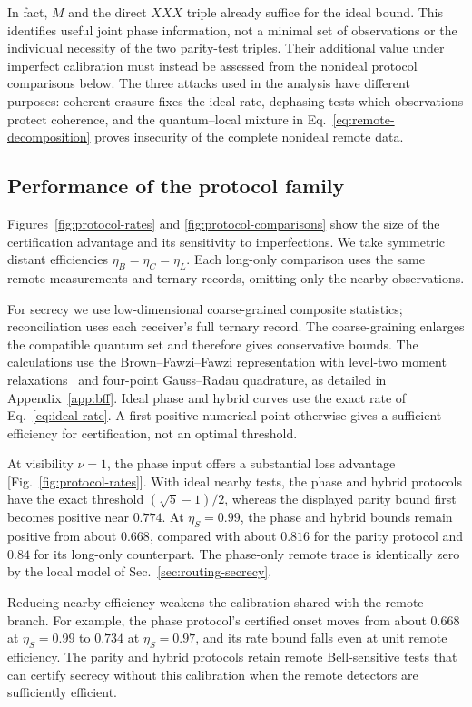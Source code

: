 \documentclass[aps,10pt,onecolumn,prx,superscriptaddress,longbibliography,nofootinbib]{revtex4-2}
\begin{document}
In fact, \(M\) and the direct \(XXX\) triple already suffice for the ideal bound. This identifies useful joint phase information, not a minimal set of observations or the individual necessity of the two parity-test triples. Their additional value under imperfect calibration must instead be assessed from the nonideal protocol comparisons below. The three attacks used in the analysis have different purposes: coherent erasure fixes the ideal rate, dephasing tests which observations protect coherence, and the quantum--local mixture in Eq.~\eqref{eq:remote-decomposition} proves insecurity of the complete nonideal remote data.

\subsection{Performance of the protocol family}

Figures~\ref{fig:protocol-rates} and \ref{fig:protocol-comparisons} show the size of the certification advantage and its sensitivity to imperfections. We take symmetric distant efficiencies \(\eta_B=\eta_C=\eta_L\). Each long-only comparison uses the same remote measurements and ternary records, omitting only the nearby observations.

For secrecy we use low-dimensional coarse-grained composite statistics; reconciliation uses each receiver's full ternary record. The coarse-graining enlarges the compatible quantum set and therefore gives conservative bounds. The calculations use the Brown--Fawzi--Fawzi representation with level-two moment relaxations~\cite{Brown2021,Brown2024,NPA2007,NPA2008,Pironio2010} and four-point Gauss--Radau quadrature, as detailed in Appendix~\ref{app:bff}. Ideal phase and hybrid curves use the exact rate of Eq.~\eqref{eq:ideal-rate}. A first positive numerical point otherwise gives a sufficient efficiency for certification, not an optimal threshold.

At visibility \(\nu=1\), the phase input offers a substantial loss advantage [Fig.~\ref{fig:protocol-rates}]. With ideal nearby tests, the phase and hybrid protocols have the exact threshold \((\sqrt5-1)/2\), whereas the displayed parity bound first becomes positive near \(0.774\). At \(\eta_S=0.99\), the phase and hybrid bounds remain positive from about \(0.668\), compared with about \(0.816\) for the parity protocol and \(0.84\) for its long-only counterpart. The phase-only remote trace is identically zero by the local model of Sec.~\ref{sec:routing-secrecy}.

Reducing nearby efficiency weakens the calibration shared with the remote branch. For example, the phase protocol's certified onset moves from about \(0.668\) at \(\eta_S=0.99\) to \(0.734\) at \(\eta_S=0.97\), and its rate bound falls even at unit remote efficiency. The parity and hybrid protocols retain remote Bell-sensitive tests that can certify secrecy without this calibration when the remote detectors are sufficiently efficient.
\end{document}
